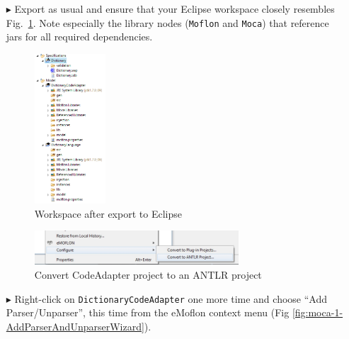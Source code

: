 \begin{enumerate}
\item[$\blacktriangleright$] Export as usual and ensure that your Eclipse workspace closely resembles Fig.~\ref{fig:moca-6-ExportToEclipse}.
Note especially the library nodes (\texttt{Moflon} and \texttt{Moca}) that reference jars for all required dependencies.

\begin{figure}[!htbp]
\begin{center}
 \includegraphics[width=0.25\textwidth]{pics/moca/1DictionaryMetaModel/6-ExportToEclipse}
  \caption{Workspace after export to Eclipse}
  \label{fig:moca-6-ExportToEclipse}
\end{center}
\end{figure}

\begin{figure}[!htbp]
\begin{center}
 \includegraphics[width=0.72\textwidth]{pics/moca/2TextToMocaTree/0-ConvertToANTLRProject.jpg}
  \caption{Convert CodeAdapter project to an ANTLR project} 
  \label{fig:moca-0-ConvertToANTLRProject.jpg}
\end{center} 
\end{figure} 

\item[$\blacktriangleright$] Right-click on \texttt{DictionaryCodeAdapter} one more time and choose ``Add Parser/Unparser'', this time from the eMoflon context menu (Fig \ref{fig:moca-1-AddParserAndUnparserWizard}).


\end{enumerate}
